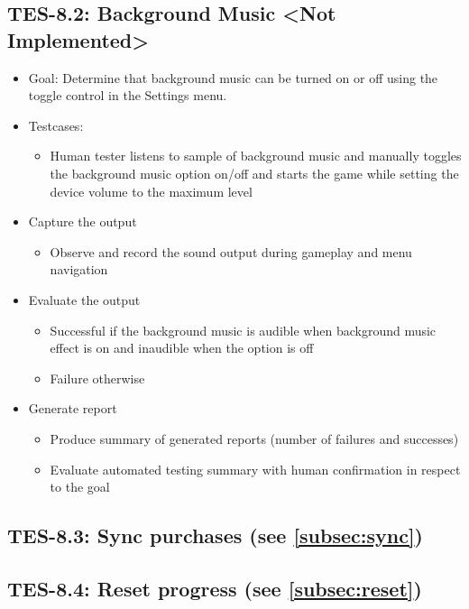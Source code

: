 \subsection{TES-8.2: Background Music <Not Implemented>}
\begin{itemize}
\item Goal: Determine that background music can be turned on or off using the toggle control in the Settings menu.

\item Testcases: 
\begin{itemize}
\item Human tester listens to sample of background music and manually toggles the background music option on/off and starts the game while setting the device volume to the maximum level
\end{itemize}

\item Capture the output 
\begin{itemize}
\item Observe and record the sound output during gameplay and menu navigation
\end{itemize}

\item Evaluate the output 
\begin{itemize}
\item Successful if the background music is audible when background music effect is on and inaudible when the option is off
\item Failure otherwise
\end{itemize}

\item Generate report 
\begin{itemize}
\item Produce summary of generated reports (number of failures and successes)
\item Evaluate automated testing summary with human confirmation in respect to the goal
\end{itemize}
\end{itemize}

\subsection{TES-8.3: Sync purchases (see \ref{subsec:sync})}
\subsection{TES-8.4: Reset progress  (see \ref{subsec:reset})}
